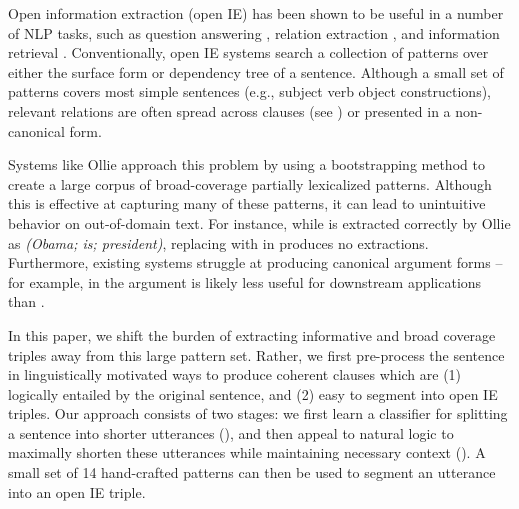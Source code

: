 Open information extraction (open IE) has been shown to be useful in a
  number of NLP tasks, such as question answering \cite{key:2014fader-openqa},
  relation extraction \cite{key:2010soderland-adapting}, 
  and information retrieval \cite{key:2011etzioni-nature}.
Conventionally, open IE systems search a collection of patterns over either
  the surface form or dependency tree of a sentence.
Although a small set of patterns covers most simple sentences 
  (e.g., subject verb object constructions),
  relevant relations are often spread across clauses (see
  ) or presented in a non-canonical form.

Systems like Ollie \cite{key:2012mausam-ollie} approach this problem by 
  using a bootstrapping method to create a large corpus of broad-coverage
  partially lexicalized patterns.
Although this is effective at capturing many of these patterns,
  it can lead to unintuitive behavior on out-of-domain text.
For instance, while  is extracted correctly by Ollie
  as \textit{(Obama; is; president)}, replacing  with  in 
   produces no extractions.
Furthermore, existing systems struggle at producing
  canonical argument forms -- for example, in  the argument
   is likely less useful for downstream
  applications than .

In this paper, we shift the burden of extracting informative and broad
  coverage triples away from this large pattern set.
Rather, we first pre-process the sentence in linguistically motivated ways
  to produce coherent clauses which are (1) logically entailed by the 
  original sentence, and (2) easy to segment into open IE triples.
Our approach consists of two stages:
  we first learn a classifier for splitting a sentence into shorter
  utterances (), 
  and then appeal to natural logic \cite{key:1991valencia-natlog}
  to maximally
  shorten these utterances while maintaining necessary context ().
A small set of 14 hand-crafted patterns can then be used to segment an
  utterance into an open IE triple.

